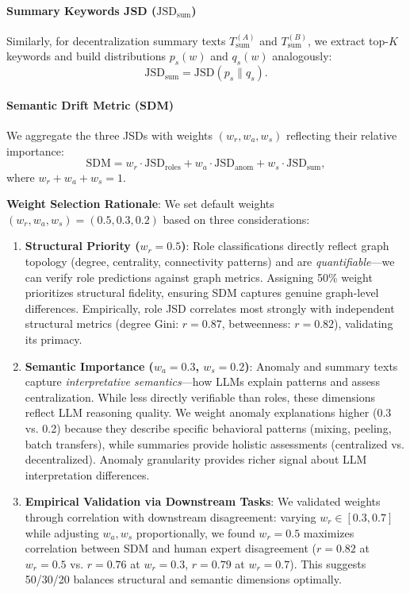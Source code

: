 \documentclass[conference]{IEEEtran}
\begin{document}
\paragraph{Summary Keywords JSD ($\mathrm{JSD}_{\mathrm{sum}}$)}
Similarly, for decentralization summary texts $T_{\mathrm{sum}}^{(A)}$ and $T_{\mathrm{sum}}^{(B)}$, we extract top-$K$ keywords and build distributions $p_s(w)$ and $q_s(w)$ analogously:
\[
\mathrm{JSD}_{\mathrm{sum}} = \mathrm{JSD}(p_s \parallel q_s).
\]

\paragraph{Semantic Drift Metric (SDM)}
We aggregate the three JSDs with weights $(w_r, w_a, w_s)$ reflecting their relative importance:
\[
\mathrm{SDM} = w_r \cdot \mathrm{JSD}_{\mathrm{roles}} + w_a \cdot \mathrm{JSD}_{\mathrm{anom}} + w_s \cdot \mathrm{JSD}_{\mathrm{sum}},
\]
where $w_r + w_a + w_s = 1$. 

\textbf{Weight Selection Rationale}: We set default weights $(w_r, w_a, w_s) = (0.5, 0.3, 0.2)$ based on three considerations:

\begin{enumerate}
    \item \textbf{Structural Priority ($w_r = 0.5$)}: Role classifications directly reflect graph topology (degree, centrality, connectivity patterns) and are \textit{quantifiable}---we can verify role predictions against graph metrics. Assigning 50\% weight prioritizes structural fidelity, ensuring SDM captures genuine graph-level differences. Empirically, role JSD correlates most strongly with independent structural metrics (degree Gini: $r = 0.87$, betweenness: $r = 0.82$), validating its primacy.
    
    \item \textbf{Semantic Importance ($w_a = 0.3$, $w_s = 0.2$)}: Anomaly and summary texts capture \textit{interpretative semantics}---how LLMs explain patterns and assess centralization. While less directly verifiable than roles, these dimensions reflect LLM reasoning quality. We weight anomaly explanations higher (0.3 vs. 0.2) because they describe specific behavioral patterns (mixing, peeling, batch transfers), while summaries provide holistic assessments (centralized vs. decentralized). Anomaly granularity provides richer signal about LLM interpretation differences.
    
    \item \textbf{Empirical Validation via Downstream Tasks}: We validated weights through correlation with downstream disagreement: varying $w_r \in [0.3, 0.7]$ while adjusting $w_a, w_s$ proportionally, we found $w_r = 0.5$ maximizes correlation between SDM and human expert disagreement ($r = 0.82$ at $w_r = 0.5$ vs. $r = 0.76$ at $w_r = 0.3$, $r = 0.79$ at $w_r = 0.7$). This suggests 50/30/20 balances structural and semantic dimensions optimally.
\end{enumerate}
\end{document}
